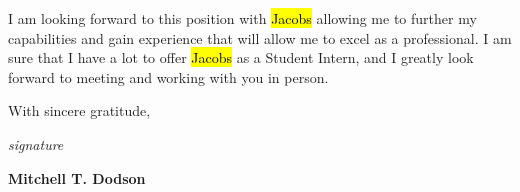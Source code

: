 \documentclass[11pt]{article}
\begin{document}
I am looking forward to this position with \hl{Jacobs} allowing me to further my capabilities and gain experience that will allow me to excel as a professional. I am sure that I have a lot to offer \hl{Jacobs} as a Student Intern, and I greatly look forward to meeting and working with you in person.

\noindent
With sincere gratitude,

\vspace{1em}

\noindent
\textit{ signature }

\vspace{1em}

\noindent
\textbf{Mitchell T. Dodson}

\printbibliography
\end{document}
